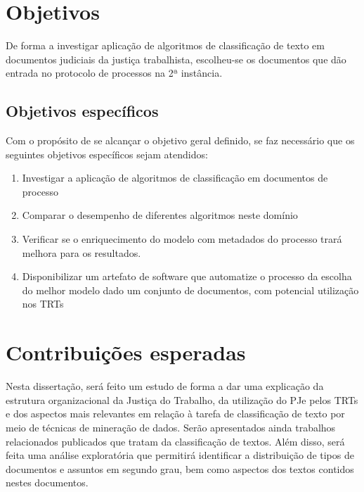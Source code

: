 
\section{Objetivos}%
De forma a investigar aplicação de algoritmos de classificação de texto em documentos judiciais da justiça trabalhista, escolheu-se os documentos que dão entrada no protocolo de processos na 2ª instância.


\subsection{Objetivos específicos}%

Com o propósito de se alcançar o objetivo geral definido, se faz necessário que os seguintes objetivos específicos sejam atendidos:
\begin{enumerate}
\item Investigar a aplicação de algoritmos de classificação em documentos de processo
\item Comparar o desempenho de diferentes algoritmos neste domínio
\item Verificar se o enriquecimento do modelo com metadados do processo trará melhora para os resultados.
\item Disponibilizar um artefato de software que automatize o processo da escolha do melhor modelo dado um conjunto de documentos, com potencial utilização nos TRTs
\end{enumerate}




\section{Contribuições esperadas}
Nesta dissertação, será feito um estudo de forma a dar uma explicação da estrutura organizacional da Justiça do Trabalho, da utilização do PJe pelos TRTs e dos aspectos mais relevantes em relação à tarefa de classificação de texto por meio de técnicas de mineração de dados. Serão apresentados ainda trabalhos relacionados publicados que tratam da classificação de textos. Além disso, será feita uma análise exploratória que permitirá identificar a distribuição de tipos de documentos e assuntos em segundo grau, bem como aspectos dos textos contidos nestes documentos. 

